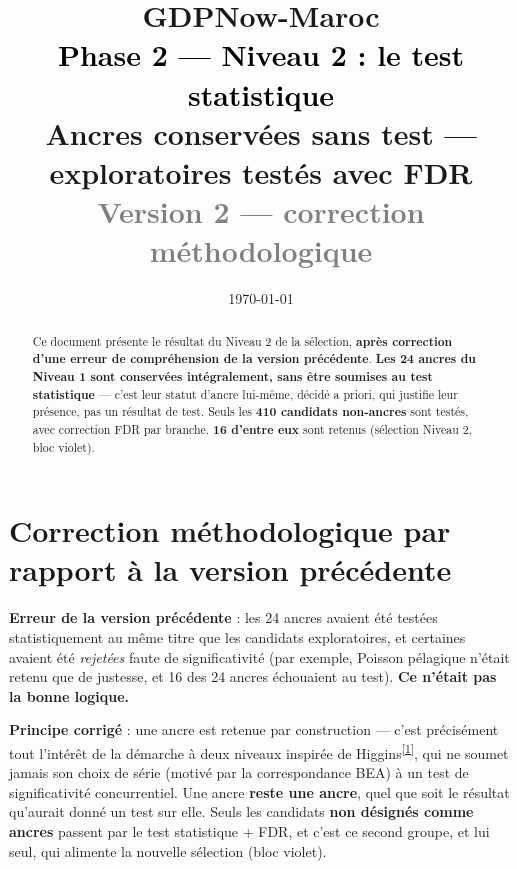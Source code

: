 \documentclass[11pt,a4paper]{article}
\title{\vspace{-1.3cm}\textcolor{bleuprincip}{\Huge\bfseries GDPNow-Maroc}\\[0.3cm]
\textcolor{black}{\Large Phase 2 --- Niveau 2 : le test statistique}\\[0.15cm]
\textcolor{violetselect}{\large Ancres conservées sans test --- exploratoires testés avec FDR}\\[0.1cm]
\textcolor{gray}{\normalsize Version 2 --- correction méthodologique}}
\author{}
\date{\today}
\newcommand{\cit}[1]{\textsuperscript{\hyperlink{ref#1}{[#1]}}}
\begin{document}
\maketitle
\thispagestyle{empty}

\begin{abstract}
\noindent Ce document présente le résultat du Niveau 2 de la sélection, \textbf{après correction d'une erreur de compréhension de la version précédente}. \textbf{Les 24 ancres du Niveau 1 sont conservées intégralement, sans être soumises au test statistique} --- c'est leur statut d'ancre lui-même, décidé a priori, qui justifie leur présence, pas un résultat de test. Seuls les \textbf{410 candidats non-ancres} sont testés, avec correction FDR par branche. \textbf{16 d'entre eux} sont retenus (sélection Niveau 2, bloc violet).
\end{abstract}

\tableofcontents
\vspace{0.3cm}

\section{Correction méthodologique par rapport à la version précédente}

\begin{noteboxbleu}
\textbf{Erreur de la version précédente} : les 24 ancres avaient été testées statistiquement au même titre que les candidats exploratoires, et certaines avaient été \emph{rejetées} faute de significativité (par exemple, Poisson pélagique n'était retenu que de justesse, et 16 des 24 ancres échouaient au test). \textbf{Ce n'était pas la bonne logique.}

\textbf{Principe corrigé} : une ancre est retenue par construction --- c'est précisément tout l'intérêt de la démarche à deux niveaux inspirée de Higgins\cit{1}, qui ne soumet jamais son choix de série (motivé par la correspondance BEA) à un test de significativité concurrentiel. Une ancre \textbf{reste une ancre}, quel que soit le résultat qu'aurait donné un test sur elle. Seuls les candidats \textbf{non désignés comme ancres} passent par le test statistique + FDR, et c'est ce second groupe, et lui seul, qui alimente la nouvelle sélection (bloc violet).
\end{noteboxbleu}

\end{document}
